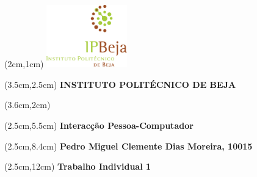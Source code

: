 \thispagestyle{empty}
\begin{titlepage}
  \vspace*{2cm}
  \baselineskip=24pt
  \textblockorigin{-18pt}{-2pt}
  \begin{textblock*}{10cm}(2cm,1cm)
    \includegraphics[width=3.5cm]{LOGO_IPB.png}
  \end{textblock*}
  \textblockorigin{-18pt}{-2pt}
  \begin{textblock*}{18cm}(3.5cm,2.5cm)
    \centering
    \textbf{{\large INSTITUTO POLITÉCNICO DE BEJA}}
  \end{textblock*}


  \textblockorigin{0cm}{3.5cm}
  \begin{textblock*}{13cm}(3.6cm,2cm)
    \centering
  \end{textblock*}

   \textblockorigin{0cm}{5cm}
   \begin{textblock*}{16cm}(2.5cm,5.5cm)
     \centering
       \textbf{{\large Interacção Pessoa-Computador}}
   \end{textblock*}


   \textblockorigin{0cm}{5cm}
   \begin{textblock*}{16cm}(2.5cm,8.4cm)
     \centering
       \textbf{{\large Pedro Miguel Clemente Dias Moreira, 10015\\}}
   \end{textblock*}

   \textblockorigin{0cm}{5cm}
   \begin{textblock*}{16cm}(2.5cm,12cm)
     \centering
       \textbf{{\large Trabalho Individual 1}}
   \end{textblock*}


\end{titlepage}
